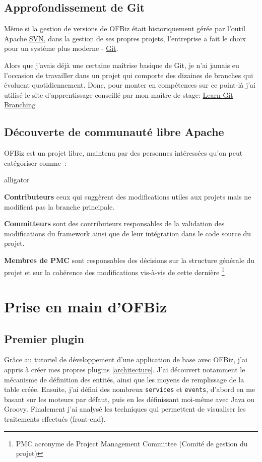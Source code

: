 \subsection{Approfondissement de Git }
Même si la gestion de versions de OFBiz était historiquement gérée par l'outil Apache \href{https://subversion.apache.org/}{SVN}, dans la gestion de ses propres projets, l'entreprise a fait le choix pour un système plus moderne - \href{https://git-scm.com/}{Git}. 

Alors que j'avais déjà une certaine maîtrise basique de Git, je n'ai jamais eu l'occasion de travailler dans un projet qui comporte des dizaines de branches qui évoluent quotidiennement. Donc, pour monter en compétences sur ce point-là j'ai utilisé le site d'apprentissage conseillé par mon maître de stage: \href{https://learngitbranching.js.org/}{Learn Git Branching}

\subsection{Découverte de communauté libre Apache}
 OFBiz est un projet libre, maintenu par des personnes intéressées qu'on peut catégoriser comme~:
 \begin{labeling}{alligator}
 	\item [\textbf{Contributeurs}] ceux qui suggèrent des modifications utiles aux projets mais ne modifient pas la branche principale.
 	\item [\textbf{Committeurs}] sont des contributeurs responsables de la validation des modifications du framework ainsi que de leur intégration dans le code source du projet. 
 	\item [\textbf{Membres de PMC}] sont responsables des décisions sur la structure générale du projet et sur la cohérence des modifications vis-à-vis de cette dernière  \footnote{PMC acronyme de Project Management Committee (Comité de gestion du projet)}
 \end{labeling}
 
 





\section{Prise en main d'OFBiz}

\subsection{Premier plugin}
Grâce au tutoriel de développement d'une application de base avec OFBiz, j'ai appris à créer mes propres plugins \ref{architecture}. J'ai découvert notamment le mécanisme de définition des entités, ainsi que les moyens de remplissage de la table créée. Ensuite, j'ai défini des nombreux \verb|services| et \verb|events|, d'abord en me basant sur les moteurs par défaut, puis en les définissant moi-même avec Java ou Groovy. Finalement j'ai analysé les techniques qui permettent de visualiser les traitements effectués (front-end).  
